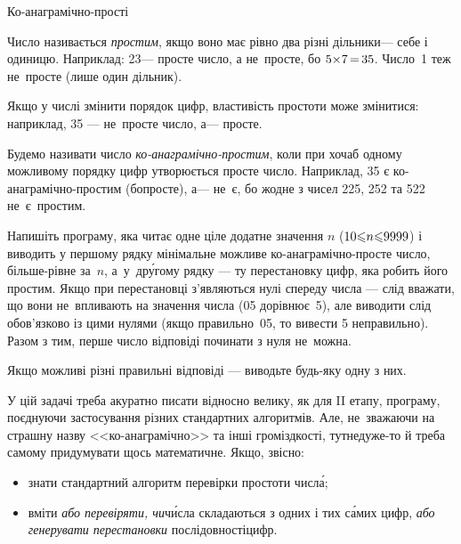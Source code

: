 \documentclass[14pt,a4paper]{extarticle}
\def\dib#1{\,#1\discretionary{}{\mbox{$#1$}}{}\,}
\begin{document}
\begin{problemAllDefault}{Ко-анаграмічно-прості}

Число називається \emph{простим}, якщо воно має рівно два різні дільники\nolinebreak[3] --- себе і одиницю. Наприклад: 23\nolinebreak[3] --- просте число, а не~просте, бо $5{\*}7\dib{{=}}35$. Число~1 теж не~просте (лише один дільник).

Якщо у числі змінити порядок цифр, властивість простоти може змінитися: наприклад, 35 --- не~просте число, а\nolinebreak[3] --- просте.

Будемо називати число \emph{ко-анаграмічно-простим}, коли при хоча\nolinebreak[3] б одному можливому порядку цифр утворюється просте число. Наприклад, 35 є ко-анаграмічно-простим (бо\nolinebreak[3] просте), а\nolinebreak[3] --- не~є, бо жодне з чисел 225, 252 та 522 не~є~простим.

Напишіть програму, яка читає одне ціле додатне значення $n$ ($10{\leqslant}n{\leqslant}9999$) і виводить у першому рядку мінімальне можливе ко-анаграмічно-просте число, більше-рівне за~$n$, а~у~др\'{у}гому рядку --- ту перестановку цифр, яка робить його простим. Якщо при перестановці з’являються нулі спереду числа --- слід вважати, що вони не~впливають на значення числа (05 дорівнює~5), але виводити слід обов’язково із цими нулями (якщо правильно~05, то вивести 5 неправильно). Разом з тим, перше число відповіді починати з нуля не~можна.

Якщо можливі різні правильні відповіді --- виводьте будь-яку одну з них.

\Examples
\begin{exampleSimple}{4em}{4em}%
%
%
%
\end{exampleSimple}

\end{problemAllDefault}
	

\Tutorial	У цій задачі треба акуратно писати відносно велику, як для II етапу, програму, поєднуючи застосування різних стандартних алгоритмів. Але, не~зважаючи на страшну назву <<ко-ана\-гра\-мічно>> та інші громіздкості, тут\nolinebreak[2] не\nolinebreak[3] дуже-то й треба самому придумувати щось математичне. Якщо, звісно:

\begin{itemize}[leftmargin=*,itemsep=0pt,partopsep=0pt,topsep=0pt,parsep=0pt]

\item
знати стандартний алгоритм перевірки простоти числ\'{а};

\item
вміти \emph{або перевіряти, чи}\nolinebreak[2] ч\'{и}сла складаються з одних і тих с\'{а}мих цифр, \emph{або генерувати перестановки} послідовності\nolinebreak[3] цифр.

\end{itemize}
\end{document}
